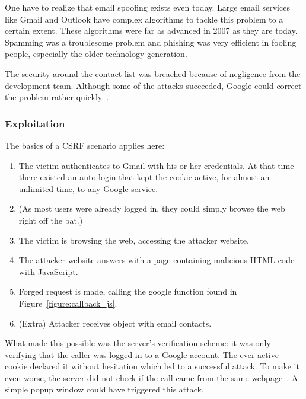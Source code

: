 \documentclass[a4paper,11pt,openany]{report}
\begin{document}
  One have to realize that email spoofing exists even today. Large email services like Gmail and Outlook have
  complex algorithms to tackle this problem to a certain extent. These algorithms were far as advanced in 2007 as 
  they are today. Spamming was a troublesome problem and phishing was very efficient in fooling people, especially 
  the older technology generation.
  
  The security around the contact list was breached because of negligence from the development team. Although
  some of the attacks succeeded, Google could correct the problem rather quickly~\cite{oreilly}.

  \subsubsection{Exploitation}
  The basics of a CSRF scenario applies here:
  \begin{enumerate}
   \itemsep0pt %
   \item The victim authenticates to Gmail with his or her credentials. At that time there existed an auto login
   that kept the cookie active, for almost an unlimited time, to any Google service.
   \item (As most users were already logged in, they could simply browse the web right off the bat.)
   \item The victim is browsing the web, accessing the attacker website. 
   \item The attacker website answers with a page containing malicious HTML code with JavaScript.
   \item Forged request is made, calling the google function found in Figure~\ref{figure:callback_js}.
   \item (Extra) Attacker receives object with email contacts. %
  \end{enumerate}
  
  What made this possible was the server's verification scheme: it was only verifying that the caller was logged in 
  to a Google account. The ever active cookie declared it without hesitation which led to a successful attack.
  To make it even worse, the server did not check if the call came from the same webpage~\cite{gmail_contact_list_csrf}. A simple popup window could 
  have triggered this attack.
  
  \nocite{gmail_contact_list_csrf2}
  
\end{document}
